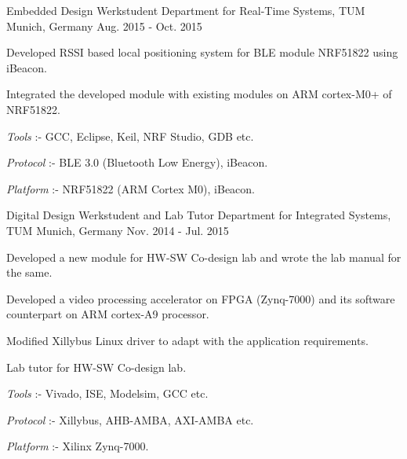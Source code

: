 \begin{cventries}
  \cventry
    {Embedded Design Werkstudent} %
    {Department for Real-Time Systems, TUM} %
    {Munich, Germany} %
    {Aug. 2015 - Oct. 2015} %
    {
      \begin{cvitems} %
        \item {Developed RSSI based local positioning system for BLE module NRF51822 using iBeacon.}
        \item {Integrated the developed module with existing modules on ARM cortex-M0+ of NRF51822.}
        \item {\textit{Tools} :- GCC, Eclipse, Keil, NRF Studio, GDB etc.}
        \item {\textit{Protocol} :- BLE 3.0 (Bluetooth Low Energy), iBeacon.}
        \item {\textit{Platform} :- NRF51822 (ARM Cortex M0), iBeacon.}
      \end{cvitems}
    }

    
  \cventry
    {Digital Design Werkstudent and Lab Tutor} %
    {Department for Integrated Systems, TUM} %
    {Munich, Germany} %
    {Nov. 2014 - Jul. 2015} %
    {
      \begin{cvitems} %
        \item {Developed a new module for HW-SW Co-design lab and wrote the lab manual for the same.}
        \item {Developed a video processing accelerator on FPGA (Zynq-7000) and its software counterpart on ARM cortex-A9 processor.}
        \item {Modified Xillybus Linux driver to adapt with the application requirements.}
        \item {Lab tutor for HW-SW Co-design lab.}
        \item {\textit{Tools} :- Vivado, ISE, Modelsim, GCC etc.}
        \item {\textit{Protocol} :- Xillybus, AHB-AMBA, AXI-AMBA etc.}
        \item {\textit{Platform} :- Xilinx Zynq-7000.}
      \end{cvitems}
    }


\end{cventries}
